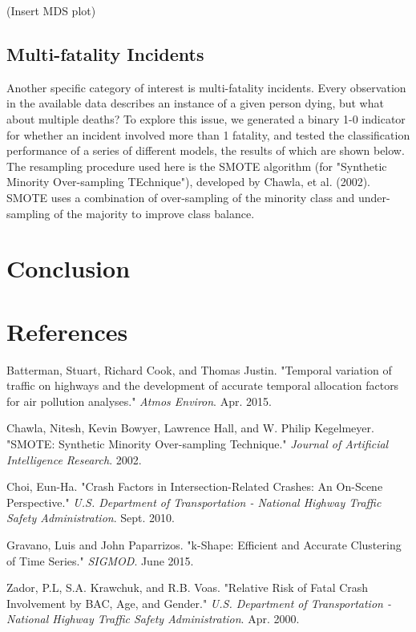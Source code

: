 \documentclass[11pt, oneside]{article}   	%
\begin{document}
(Insert MDS plot) \\



\subsection*{Multi-fatality Incidents}
Another specific category of interest is multi-fatality incidents. Every observation in the available data describes an instance of a given person dying, but what about multiple deaths? To explore this issue, we generated a binary 1-0 indicator for whether an incident involved more than 1 fatality, and tested the classification performance of a series of different models, the results of which are shown below. The resampling procedure used here is the SMOTE algorithm (for "Synthetic Minority Over-sampling TEchnique"), developed by Chawla, et al. (2002). SMOTE uses a combination of over-sampling of the minority class and under-sampling of the majority to improve class balance. \\



\section*{Conclusion}

\section*{References}
\begin{hangparas}{1.27cm}{1}
Batterman, Stuart, Richard Cook, and Thomas Justin. "Temporal variation of traffic on highways and the development of accurate temporal allocation factors for air pollution analyses." \textit{Atmos Environ}. Apr. 2015.

Chawla, Nitesh, Kevin Bowyer, Lawrence Hall, and W. Philip Kegelmeyer. "SMOTE: Synthetic Minority Over-sampling Technique." \textit{Journal of Artificial Intelligence Research}. 2002.

Choi, Eun-Ha. "Crash Factors in Intersection-Related Crashes: An On-Scene Perspective." \textit{U.S. Department of Transportation - National Highway Traffic Safety Administration}. Sept. 2010.

Gravano, Luis and John Paparrizos. "k-Shape: Efficient and Accurate Clustering of Time Series." \textit{SIGMOD}. June 2015.

Zador, P.L, S.A. Krawchuk, and R.B. Voas. "Relative Risk of Fatal Crash Involvement by BAC, Age, and Gender." \textit{U.S. Department of Transportation - National Highway Traffic Safety Administration}. Apr. 2000.




\end{hangparas}
\end{document}
